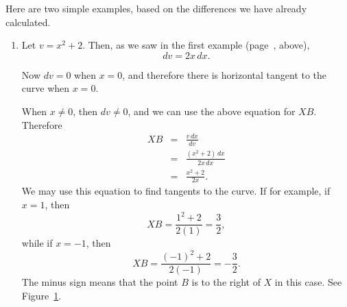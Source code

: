 \documentclass[polutonikogreek,english,twoside,openright]{article}
\begin{document}
 Here are two simple examples, based on the differences we have already calculated.
\begin{enumerate}
\item Let $v = x^2 + 2.$  Then, as we saw in the first example (page~\pageref{ex1}, above),
$$dv = 2x\,dx.$$

Now $dv=0$ when $x=0$, and therefore there is horizontal tangent to the curve when $x=0$.

When $x\neq 0$, then $dv \neq 0$, and we can use the above equation for $XB$.  Therefore
\begin{eqnarray*}
XB & = & \frac{v\, dx}{dv}\\
& = & \frac{(x^2 + 2)\,dx}{2x\,dx}\\
& = & \frac{x^2 + 2}{2x}.
\end{eqnarray*}
We may use this equation to find tangents to the curve.  If for example, if $x=1$, then
$$XB = \frac{1^2 +2}{2(1)} = \frac{3}{2},$$
while if $x=-1$, then
$$XB = \frac{(-1)^2 + 2}{2(-1)} = -\frac{3}{2}.$$
The minus sign means that the point $B$ is to the right of $X$ in this
case.  See Figure~\ref{tangex1}.
\begin{figure}[htp]
\begin{center}
\caption{}
\label{tangex1}
\vspace{-10pt}
\end{center}
\end{figure}


\end{enumerate}
\end{document}
